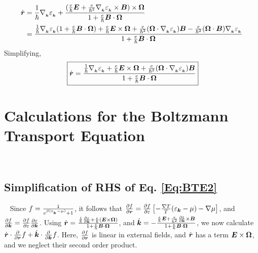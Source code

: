 \documentclass{report}
\renewcommand\vec[1]{\ensuremath\boldsymbol{#1}} %
\begin{document}
$$\begin{aligned}
\dot{\vec{r}} & = \frac{1}{\hbar} \nabla{_{_{\vec{k}}}} \varepsilon_{_{\vec{k}}} +\frac{ (\frac{e}{\hbar} \vec{E} + \frac{e}{\hbar^2} \nabla{_{_{\vec{k}}}} \varepsilon_{_{\vec{k}}} \times \vec{B}) \times \vec{\Omega}}{1 + \frac{e}{\hbar} \vec{B}\cdot\vec{\Omega}} \\
& = \frac{\frac{1}{\hbar} \nabla{_{_{\vec{k}}}} \varepsilon_{_{\vec{k}}} (1 + \frac{e}{\hbar} \vec{B}\cdot\vec{\Omega}) + \frac{e}{\hbar} \vec{E} \times \vec{\Omega} + \frac{e}{\hbar^2} (\vec{\Omega} \cdot \nabla{_{_{\vec{k}}}} \varepsilon_{_{\vec{k}}})\vec{B} - \frac{e}{\hbar^2} (\vec{\Omega} \cdot \vec{B})\nabla{_{_{\vec{k}}}} \varepsilon_{_{\vec{k}}}}{1 + \frac{e}{\hbar} \vec{B}\cdot\vec{\Omega}}
\end{aligned}
$$
Simplifying,
\begin{equation}~\label{Eq:decoupled-rdot-app}
\boxed{\dot{\vec{r}} = \frac{\frac{1}{\hbar} \nabla{_{_{\vec{k}}}} \varepsilon_{_{\vec{k}}} + \frac{e}{\hbar} \vec{E} \times \vec{\Omega} + \frac{e}{\hbar^2} (\vec{\Omega} \cdot \nabla{_{_{\vec{k}}}} \varepsilon_{_{\vec{k}}})\vec{B} }{1 + \frac{e}{\hbar} \vec{B}\cdot\vec{\Omega}}}
\end{equation}
\chapter{Calculations for the Boltzmann Transport Equation}~\label{app:BTE_Calc}
\section{Simplification of RHS of Eq. \eqref{Eq:BTE2}}~\label{app:sec:BTE_simp_RHS}
Since $f = \frac{1}{e^{\beta (\varepsilon_{_{\vec{k}}} - \mu)}+1}$, it follows that $\frac{\partial f}{\partial \vec{r}} = \frac{\partial f}{\partial \varepsilon} \left[-\frac{\nabla T}{T} (\varepsilon_{\vec{k}} - \mu) - \nabla \mu \right]$, and $\frac{\partial f}{\partial \vec{k}} = \frac{\partial f}{\partial \varepsilon} \frac{\partial \varepsilon}{\partial \vec{k}}$. Using
${\dot{\vec{r}} = \frac{\frac{1}{\hbar} \frac{\partial \varepsilon}{\partial \vec{k}} + \frac{e}{\hbar} (\vec{E}\times\vec{\Omega})}{1 + \frac{e}{\hbar} \vec{B}\cdot\vec{\Omega}}}$, and $\dot{\vec{k}} = -\frac{\frac{e}{\hbar} \vec{E} +\frac{e}{\hbar^2} \frac{\partial \varepsilon}{\partial \vec{k}} \times \vec{B}}{1 + \frac{e}{\hbar} \vec{B}\cdot\vec{\Omega}}$, we now calculate $\dot{\vec{r}} \cdot \frac{\partial }{\partial \vec{r}} f + \dot{\vec{k}} \cdot \frac{\partial}{\partial \vec{k}} f$. Here, $\frac{\partial f}{\partial \vec{r}}$ is linear in external fields, and $\dot{\vec{r}}$ has a term $\vec{E}\times\vec{\Omega}$, and we neglect their second order product.
\end{document}

